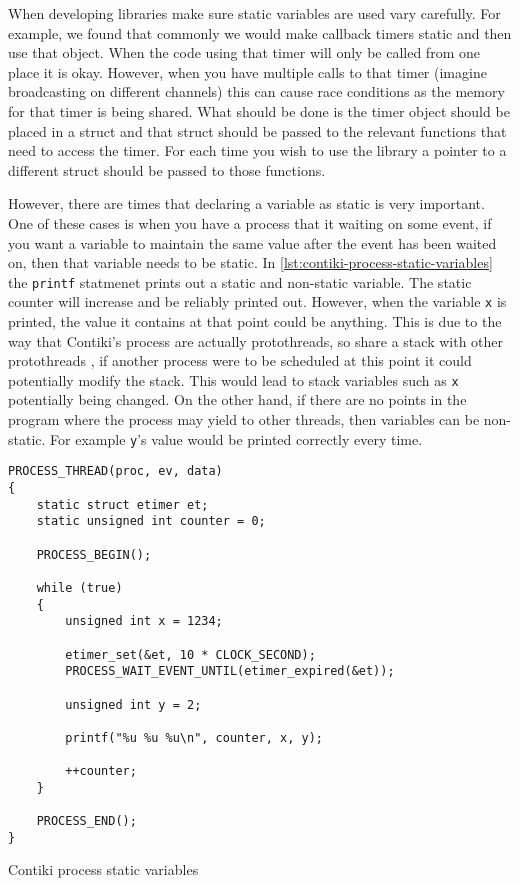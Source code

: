 When developing libraries make sure static variables are used vary carefully. For example, we found that commonly we would make callback timers static and then use that object. When the code using that timer will only be called from one place it is okay. However, when you have multiple calls to that timer (imagine broadcasting on different channels) this can cause race conditions as the memory for that timer is being shared. What should be done is the timer object should be placed in a struct and that struct should be passed to the relevant functions that need to access the timer. For each time you wish to use the library a pointer to a different struct should be passed to those functions.

However, there are times that declaring a variable as static is very important. One of these cases is when you have a process that it waiting on some event, if you want a variable to maintain the same value after the event has been waited on, then that variable needs to be static. In \autoref{lst:contiki-process-static-variables} the \verb|printf| statmenet prints out a static and non-static variable. The static counter will increase and be reliably printed out. However, when the variable \verb|x| is printed, the value it contains at that point could be anything. This is due to the way that Contiki's process are actually protothreads, so share a stack with other protothreads \cite{Dunkels:2006:PSE:1182807.1182811}, if another process were to be scheduled at this point it could potentially modify the stack. This would lead to stack variables such as \verb|x| potentially being changed. On the other hand, if there are no points in the program where the process may yield to other threads, then variables can be non-static. For example \verb|y|'s value would be printed correctly every time.

\begin{listing}[H]
\begin{verbatim}
PROCESS_THREAD(proc, ev, data)
{
	static struct etimer et;
	static unsigned int counter = 0;

	PROCESS_BEGIN();

	while (true)
	{
		unsigned int x = 1234;

		etimer_set(&et, 10 * CLOCK_SECOND);
		PROCESS_WAIT_EVENT_UNTIL(etimer_expired(&et));

		unsigned int y = 2;

		printf("%u %u %u\n", counter, x, y);

		++counter;
	}

	PROCESS_END();
}
\end{verbatim}
\caption{Contiki process static variables}
\label{lst:contiki-process-static-variables}
\end{listing}

